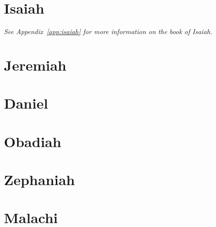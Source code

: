 \documentclass[twoside,twocolumn,9pt]{extbook} %
\newcommand\englishchaptertitle{}
\newcommand\hebrewchaptertitle{}
\newcommand\chap[2]{%
    \chapter[#1\hfill#2~~~]{#1}%
    \renewcommand\englishchaptertitle{#1}%
    \renewcommand\hebrewchaptertitle{#2}%
    \thispagestyle{empty}%
}
\newcommand\heading[1]{%
    \vspace{-0.5em}%
    {\small\emph{#1.}}%
    \vspace{0.5em}%
}
\newcommand\Hebrew[1]{{\sblh #1}}
\begin{document}
    \chap{Isaiah}{\Hebrew{ישעה}}
    {\noindent\heading{See Appendix~\ref{app:isaiah} for more information on the book of Isaiah}}
    
    
    
    \chap{Jeremiah}{\Hebrew{ירמיה}}
    
    \chap{Daniel}{\Hebrew{דניאל}}
    
    
    \chap{Obadiah}{\Hebrew{עבדיה}}
    
    \chap{Zephaniah}{\Hebrew{צפניה}}
    
    \chap{Malachi}{\Hebrew{מלאכי}}
    
    
    \appendix
    \titlespacing*{\chapter}{0em}{-5ex}{5ex}
    \titlespacing*{\section}{0em}{0.65em}{0.65em}
    \titlespacing*{\subsection}{0em}{0.65em}{0.65em}
\end{document}
